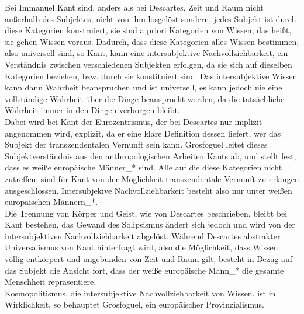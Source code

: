 Bei Immanuel Kant sind, anders als bei Descartes, Zeit und Raum nicht außerhalb
des Subjektes, nicht von ihm losgelöst sondern, jedes Subjekt ist durch diese
Kategorien konstruiert, sie sind a priori Kategorien von Wissen, das heißt, sie
gehen Wissen voraus.  Dadurch, dass diese Kategorien alles Wissen bestimmen,
also universell sind, so Kant, kann eine intersubjektive Nachvollziehbarkeit,
ein Verständnis zwischen verschiedenen Subjekten erfolgen, da sie sich auf
dieselben Kategorien beziehen, bzw. durch sie konstituiert sind.\footnotemark
{} Das intersubjektive Wissen kann dann Wahrheit
beanspruchen und ist universell, es kann jedoch nie eine vollständige Wahrheit
über die Dinge beansprucht werden, da die tatsächliche Wahrheit immer in den
Dingen verborgen bleibt. \\
Dabei wird bei Kant der Eurozentrismus, der bei Descartes nur implizit
angenommen wird, explizit, da er eine klare Definition dessen liefert, wer das
Subjekt der transzendentalen Vernunft sein kann. Grosfoguel leitet dieses
Subjektverständnis aus den anthropologischen Arbeiten Kants ab, und stellt
fest, dass es weiße europäische Männer\_* sind. Alle auf die diese Kategorien
nicht zutreffen, sind für Kant von der Möglichkeit transzendentale Vernunft zu
erlangen ausgeschlossen.\footnotemark {}
 Intersubjekive Nachvollziehbarkeit besteht also nur
unter weißen europäischen Männern\_*.\\

\noindent Die Trennung von Körper und Geist, wie von Descartes beschrieben, bleibt bei
Kant bestehen, das Gewand des Solipsismus ändert sich jedoch und wird von der
intersubjektiven Nachvollziehbarkeit abgelöst. Während Descartes abstrakter
Universalismus von Kant hinterfragt wird, also die Möglichkeit, dass Wissen
völlig entkörpert und ungebunden von Zeit und Raum gilt, besteht in Bezug auf
das Subjekt die Ansicht fort, dass der weiße europäische Mann\_* die gesamte
Menschheit repräsentiere. \\
Kosmopolitismus, die intersubjektive
Nachvollziehbarkeit von Wissen, ist in Wirklichkeit, so behauptet Grosfoguel,
ein europäischer Provinzialismus.\\


